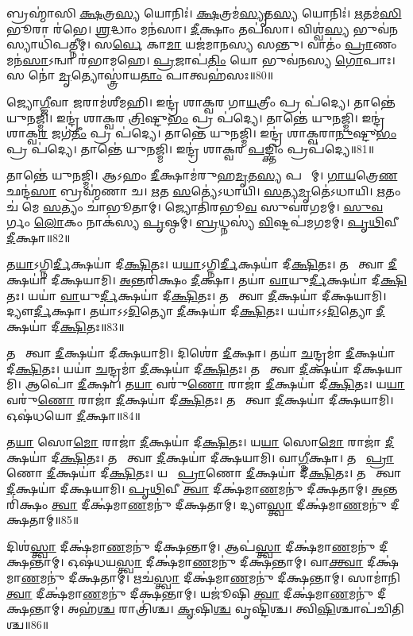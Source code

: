 𑌬𑍍𑌰𑌹𑍍𑌮𑌾॑𑌸𑌿 \ul{𑌕𑍍𑌷}𑌤𑍍𑌰\ul{𑌸𑍍𑌯} 𑌯𑍋𑌨𑌿𑌃॑।
\ul{𑌕𑍍𑌷}𑌤𑍍𑌰𑌮॑\ul{𑌸𑍍𑌯𑍃}𑌤\ul{𑌸𑍍𑌯} 𑌯𑍋𑌨𑌿𑌃॑।
\ul{𑌋}𑌤𑌮॑\ul{𑌸𑌿} 𑌭𑍂𑌰𑌾 𑌰॑𑌭𑍇।
\ul{𑌶𑍍𑌰}𑌦𑍍𑌧𑌾𑌂 𑌮𑌨॑𑌸𑌾।
\ul{𑌦𑍀}𑌕𑍍𑌷𑌾𑌂 𑌤𑌪॑𑌸𑌾।
𑌵𑌿𑌶𑍍𑌵॑\ul{𑌸𑍍𑌯} 𑌭𑍁𑌵॑\ul{𑌨}𑌸𑍍𑌯𑌾𑌧𑌿॑𑌪𑌤𑍍𑌨𑍀𑌮𑍍।
𑌸\ul{𑌰𑍍𑌵𑍇} 𑌕𑌾\ul{𑌮𑌾} 𑌯𑌜॑𑌮𑌾𑌨𑌸𑍍𑌯 𑌸𑌨𑍍𑌤𑍁।
𑌵𑌾𑌤𑌂॑ \ul{𑌪𑍍𑌰𑌾}𑌣𑌂 𑌮𑌨॑\ul{𑌸𑌾}\-𑌽𑌨𑍍𑌵𑌾 𑌰॑𑌭𑌾𑌮𑌹𑍇।
\ul{𑌪𑍍𑌰}𑌜𑌾𑌪॑\ul{𑌤𑌿𑌂} 𑌯𑍋 𑌭𑍁𑌵॑𑌨𑌸𑍍𑌯 \ul{𑌗𑍋}𑌪𑌾𑌃।
𑌸 𑌨𑍋॑ \ul{𑌮𑍃}𑌤𑍍𑌯𑍋𑌸𑍍𑌤𑍍𑌰𑌾॑𑌯\ul{𑌤𑌾𑌂} 𑌪𑌾𑌤𑍍𑌵𑌹॑𑌸𑌃॥80॥

𑌜𑍍𑌯𑍋\ul{𑌗𑍍𑌜𑍀}𑌵𑌾 \ul{𑌜}𑌰𑌾𑌮॑𑌶𑍀𑌮𑌹𑌿।
𑌇𑌨𑍍𑌦𑍍𑌰॑ 𑌶𑌾𑌕𑍍𑌵𑌰 𑌗𑌾\ul{𑌯}𑌤𑍍𑌰𑍀𑌂 𑌪𑍍𑌰 𑌪॑𑌦𑍍𑌯𑍇।
𑌤𑌾𑌨𑍍𑌤𑍇॑ 𑌯𑍁𑌨𑌜𑍍𑌮𑌿।
𑌇𑌨𑍍𑌦𑍍𑌰॑ 𑌶𑌾𑌕𑍍𑌵𑌰 \ul{𑌤𑍍𑌰𑌿}𑌷𑍍𑌟𑍁\ul{𑌭𑌂} 𑌪𑍍𑌰 𑌪॑𑌦𑍍𑌯𑍇।
𑌤𑌾𑌨𑍍𑌤𑍇॑ 𑌯𑍁𑌨𑌜𑍍𑌮𑌿।
𑌇𑌨𑍍𑌦𑍍𑌰॑ 𑌶𑌾𑌕𑍍𑌵\ul{𑌰} 𑌜𑌗॑\ul{𑌤𑍀𑌂} 𑌪𑍍𑌰 𑌪॑𑌦𑍍𑌯𑍇।
𑌤𑌾𑌨𑍍𑌤𑍇॑ 𑌯𑍁𑌨𑌜𑍍𑌮𑌿।
𑌇𑌨𑍍𑌦𑍍𑌰॑ 𑌶𑌾𑌕𑍍𑌵𑌰𑌾\ul{𑌨𑍁}𑌷𑍍𑌟𑍁\ul{𑌭𑌂} 𑌪𑍍𑌰 𑌪॑𑌦𑍍𑌯𑍇।
𑌤𑌾𑌨𑍍𑌤𑍇॑ 𑌯𑍁𑌨𑌜𑍍𑌮𑌿।
𑌇𑌨𑍍𑌦𑍍𑌰॑ 𑌶𑌾𑌕𑍍𑌵𑌰 \ul{𑌪}𑌙𑍍𑌕𑍍𑌤𑌿𑌂 𑌪𑍍𑌰𑌪॑𑌦𑍍𑌯𑍇॥81॥

𑌤𑌾𑌨𑍍𑌤𑍇॑ 𑌯𑍁𑌨𑌜𑍍𑌮𑌿।
𑌆𑌽𑌹𑌂 \ul{𑌦𑍀}𑌕𑍍𑌷𑌾𑌮॑𑌰𑍁𑌹\ul{𑌮𑍃}𑌤\ul{𑌸𑍍𑌯} 𑌪𑌤𑍍𑌨𑍀᳚𑌮𑍍।
\ul{𑌗𑌾}\ul{𑌯}𑌤𑍍𑌰𑍇\ul{𑌣} 𑌛𑌨𑍍𑌦॑\ul{𑌸𑌾} 𑌬𑍍𑌰𑌹𑍍𑌮॑𑌣𑌾 𑌚।
\ul{𑌋}𑌤 \ul{𑌸}𑌤𑍍𑌯𑍇॑\-𑌽𑌧𑌾𑌯𑌿।
\ul{𑌸}𑌤𑍍𑌯\ul{𑌮𑍃}𑌤𑍇॑\-𑌽𑌧𑌾𑌯𑌿।
\ul{𑌋}𑌤𑌂 𑌚॑ 𑌮𑍇 \ul{𑌸}𑌤𑍍𑌯𑌂 𑌚𑌾॑𑌭𑍂𑌤𑌾𑌮𑍍।
𑌜𑍍𑌯𑍋𑌤𑌿॑𑌰𑌭𑍂\ul{𑌵}\ul{} 𑌸𑍁𑌵॑𑌰𑌗𑌮𑌮𑍍।
\ul{𑌸𑍁}\ul{𑌵}𑌰𑍍𑌗𑌂 \ul{𑌲𑍋}𑌕𑌂 𑌨𑌾𑌕॑𑌸𑍍𑌯 \ul{𑌪𑍃}𑌷𑍍𑌠𑌮𑍍।
\ul{𑌬𑍍𑌰}𑌧𑍍𑌨𑌸𑍍𑌯॑ \ul{𑌵𑌿}𑌷𑍍𑌟𑌪॑𑌮𑌗𑌮𑌮𑍍।
\ul{𑌪𑍃}\ul{𑌥𑌿}𑌵𑍀 \ul{𑌦𑍀}𑌕𑍍𑌷𑌾॥82॥

𑌤\ul{𑌯𑌾}𑌽𑌗𑍍𑌨𑌿\ul{𑌰𑍍𑌦𑍀}𑌕𑍍𑌷𑌯𑌾॑ 𑌦𑍀\ul{𑌕𑍍𑌷𑌿}𑌤𑌃।
𑌯\ul{𑌯𑌾}𑌽𑌗𑍍𑌨𑌿\ul{𑌰𑍍𑌦𑍀}𑌕𑍍𑌷𑌯𑌾॑ 𑌦𑍀\ul{𑌕𑍍𑌷𑌿}𑌤𑌃।
𑌤𑌯𑌾᳚ 𑌤𑍍𑌵𑌾 \ul{𑌦𑍀}𑌕𑍍𑌷𑌯𑌾॑ 𑌦𑍀𑌕𑍍𑌷𑌯𑌾𑌮𑌿।
\ul{𑌅}𑌨𑍍𑌤𑌰𑌿॑𑌕𑍍𑌷𑌂 \ul{𑌦𑍀}𑌕𑍍𑌷𑌾।
𑌤𑌯𑌾॑ \ul{𑌵𑌾}𑌯𑍁\ul{𑌰𑍍𑌦𑍀}𑌕𑍍𑌷𑌯𑌾॑ 𑌦𑍀\ul{𑌕𑍍𑌷𑌿}𑌤𑌃।
𑌯𑌯𑌾॑ \ul{𑌵𑌾}𑌯𑍁\ul{𑌰𑍍𑌦𑍀}𑌕𑍍𑌷𑌯𑌾॑ 𑌦𑍀\ul{𑌕𑍍𑌷𑌿}𑌤𑌃।
𑌤𑌯𑌾᳚ 𑌤𑍍𑌵𑌾 \ul{𑌦𑍀}𑌕𑍍𑌷𑌯𑌾॑ 𑌦𑍀𑌕𑍍𑌷𑌯𑌾𑌮𑌿।
𑌦𑍍𑌯𑍗\ul{𑌰𑍍𑌦𑍀}𑌕𑍍𑌷𑌾।
𑌤𑌯𑌾॑𑌽𑌽\ul{𑌦𑌿}𑌤𑍍𑌯𑍋 \ul{𑌦𑍀}𑌕𑍍𑌷𑌯𑌾॑ 𑌦𑍀\ul{𑌕𑍍𑌷𑌿}𑌤𑌃।
𑌯𑌯𑌾॑𑌽𑌽\ul{𑌦𑌿}𑌤𑍍𑌯𑍋 \ul{𑌦𑍀}𑌕𑍍𑌷𑌯𑌾॑ 𑌦𑍀\ul{𑌕𑍍𑌷𑌿}𑌤𑌃॥83॥

𑌤𑌯𑌾᳚ 𑌤𑍍𑌵𑌾 \ul{𑌦𑍀}𑌕𑍍𑌷𑌯𑌾॑ 𑌦𑍀𑌕𑍍𑌷𑌯𑌾𑌮𑌿।
𑌦𑌿𑌶𑍋॑ \ul{𑌦𑍀}𑌕𑍍𑌷𑌾।
𑌤𑌯𑌾॑ \ul{𑌚}𑌨𑍍𑌦𑍍𑌰𑌮𑌾॑ \ul{𑌦𑍀}𑌕𑍍𑌷𑌯𑌾॑ 𑌦𑍀\ul{𑌕𑍍𑌷𑌿}𑌤𑌃।
𑌯𑌯𑌾॑ \ul{𑌚}𑌨𑍍𑌦𑍍𑌰𑌮𑌾॑ \ul{𑌦𑍀}𑌕𑍍𑌷𑌯𑌾॑ 𑌦𑍀\ul{𑌕𑍍𑌷𑌿}𑌤𑌃।
𑌤𑌯𑌾᳚ 𑌤𑍍𑌵𑌾 \ul{𑌦𑍀}𑌕𑍍𑌷𑌯𑌾॑ 𑌦𑍀𑌕𑍍𑌷𑌯𑌾𑌮𑌿।
𑌆𑌪𑍋॑ \ul{𑌦𑍀}𑌕𑍍𑌷𑌾।
𑌤\ul{𑌯𑌾} 𑌵𑌰𑍁॑\ul{𑌣𑍋} 𑌰𑌾𑌜𑌾॑ \ul{𑌦𑍀}𑌕𑍍𑌷𑌯𑌾॑ 𑌦𑍀\ul{𑌕𑍍𑌷𑌿}𑌤𑌃।
𑌯\ul{𑌯𑌾} 𑌵𑌰𑍁॑\ul{𑌣𑍋} 𑌰𑌾𑌜𑌾॑ \ul{𑌦𑍀}𑌕𑍍𑌷𑌯𑌾॑ 𑌦𑍀\ul{𑌕𑍍𑌷𑌿}𑌤𑌃।
𑌤𑌯𑌾᳚ 𑌤𑍍𑌵𑌾 \ul{𑌦𑍀}𑌕𑍍𑌷𑌯𑌾॑ 𑌦𑍀𑌕𑍍𑌷𑌯𑌾𑌮𑌿।
𑌓𑌷॑𑌧𑌯𑍋 \ul{𑌦𑍀}𑌕𑍍𑌷𑌾॥84॥

𑌤\ul{𑌯𑌾} 𑌸𑍋\ul{𑌮𑍋} 𑌰𑌾𑌜𑌾॑ \ul{𑌦𑍀}𑌕𑍍𑌷𑌯𑌾॑ 𑌦𑍀\ul{𑌕𑍍𑌷𑌿}𑌤𑌃।
𑌯\ul{𑌯𑌾} 𑌸𑍋\ul{𑌮𑍋} 𑌰𑌾𑌜𑌾॑ \ul{𑌦𑍀}𑌕𑍍𑌷𑌯𑌾॑ 𑌦𑍀\ul{𑌕𑍍𑌷𑌿}𑌤𑌃।
𑌤𑌯𑌾᳚ 𑌤𑍍𑌵𑌾 \ul{𑌦𑍀}𑌕𑍍𑌷𑌯𑌾॑ 𑌦𑍀𑌕𑍍𑌷𑌯𑌾𑌮𑌿।
𑌵𑌾\ul{𑌗𑍍𑌦𑍀}𑌕𑍍𑌷𑌾।
𑌤𑌯𑌾᳚ \ul{𑌪𑍍𑌰𑌾}𑌣𑍋 \ul{𑌦𑍀}𑌕𑍍𑌷𑌯𑌾॑ 𑌦𑍀\ul{𑌕𑍍𑌷𑌿}𑌤𑌃।
𑌯𑌯𑌾᳚ \ul{𑌪𑍍𑌰𑌾}𑌣𑍋 \ul{𑌦𑍀}𑌕𑍍𑌷𑌯𑌾॑ 𑌦𑍀\ul{𑌕𑍍𑌷𑌿}𑌤𑌃।
𑌤𑌯𑌾᳚ 𑌤𑍍𑌵𑌾 \ul{𑌦𑍀}𑌕𑍍𑌷𑌯𑌾॑ 𑌦𑍀𑌕𑍍𑌷𑌯𑌾𑌮𑌿।
\ul{𑌪𑍃}\ul{𑌥𑌿}𑌵𑍀 \ul{𑌤𑍍𑌵𑌾} 𑌦𑍀𑌕𑍍𑌷॑𑌮𑌾\ul{𑌣}𑌮𑌨𑍁॑ 𑌦𑍀𑌕𑍍𑌷𑌤𑌾𑌮𑍍।
\ul{𑌅}𑌨𑍍𑌤𑌰𑌿॑𑌕𑍍𑌷𑌂 \ul{𑌤𑍍𑌵𑌾} 𑌦𑍀𑌕𑍍𑌷॑𑌮𑌾\ul{𑌣}𑌮𑌨𑍁॑ 𑌦𑍀𑌕𑍍𑌷𑌤𑌾𑌮𑍍।
𑌦𑍍𑌯𑍗\ul{𑌸𑍍𑌤𑍍𑌵𑌾} 𑌦𑍀𑌕𑍍𑌷॑𑌮𑌾\ul{𑌣}𑌮𑌨𑍁॑ 𑌦𑍀𑌕𑍍𑌷𑌤𑌾𑌮𑍍॥85॥

𑌦𑌿𑌶॑\ul{𑌸𑍍𑌤𑍍𑌵𑌾} 𑌦𑍀𑌕𑍍𑌷॑𑌮𑌾\ul{𑌣}𑌮𑌨𑍁॑ 𑌦𑍀𑌕𑍍𑌷𑌨𑍍𑌤𑌾𑌮𑍍।
𑌆𑌪॑\ul{𑌸𑍍𑌤𑍍𑌵𑌾} 𑌦𑍀𑌕𑍍𑌷॑𑌮𑌾\ul{𑌣}𑌮𑌨𑍁॑ 𑌦𑍀𑌕𑍍𑌷𑌨𑍍𑌤𑌾𑌮𑍍।
𑌓𑌷॑𑌧𑌯\ul{𑌸𑍍𑌤𑍍𑌵𑌾} 𑌦𑍀𑌕𑍍𑌷॑𑌮𑌾\ul{𑌣}𑌮𑌨𑍁॑ 𑌦𑍀𑌕𑍍𑌷𑌨𑍍𑌤𑌾𑌮𑍍।
𑌵𑌾\ul{𑌕𑍍𑌤𑍍𑌵𑌾} 𑌦𑍀𑌕𑍍𑌷॑𑌮𑌾\ul{𑌣}𑌮𑌨𑍁॑ 𑌦𑍀𑌕𑍍𑌷𑌤𑌾𑌮𑍍।
𑌋𑌚॑\ul{𑌸𑍍𑌤𑍍𑌵𑌾} 𑌦𑍀𑌕𑍍𑌷॑𑌮𑌾\ul{𑌣}𑌮𑌨𑍁॑ 𑌦𑍀𑌕𑍍𑌷𑌨𑍍𑌤𑌾𑌮𑍍।
𑌸𑌾𑌮𑌾॑𑌨𑌿 \ul{𑌤𑍍𑌵𑌾} 𑌦𑍀𑌕𑍍𑌷॑𑌮𑌾\ul{𑌣}𑌮𑌨𑍁॑ 𑌦𑍀𑌕𑍍𑌷𑌨𑍍𑌤𑌾𑌮𑍍।
𑌯𑌜𑍂॑𑌷𑌿 \ul{𑌤𑍍𑌵𑌾} 𑌦𑍀𑌕𑍍𑌷॑𑌮𑌾\ul{𑌣}𑌮𑌨𑍁॑ 𑌦𑍀𑌕𑍍𑌷𑌨𑍍𑌤𑌾𑌮𑍍।
𑌅𑌹॑\ul{𑌶𑍍𑌚} 𑌰𑌾𑌤𑍍𑌰𑌿॑𑌶𑍍𑌚।
\ul{𑌕𑍃}𑌷𑌿\ul{𑌶𑍍𑌚} 𑌵𑍃𑌷𑍍𑌟𑌿॑𑌶𑍍𑌚।
𑌤𑍍𑌵𑌿\ul{𑌷𑌿}𑌶𑍍𑌚𑌾𑌪॑𑌚𑌿𑌤𑌿𑌶𑍍𑌚॥86॥

